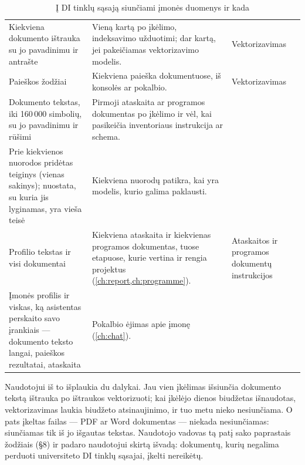 \begin{table}[H]
\caption{Į DI tinklų sąsają siunčiami įmonės duomenys ir kada}\label{tab:company:leaves}
\begin{tabularx}{\textwidth}{@{}L{43mm}YL{40mm}@{}}
\toprule
{} &  &  \\
\midrule
Kiekviena dokumento ištrauka su jo pavadinimu ir antrašte &
  Vieną kartą po įkėlimo, indeksavimo užduotimi; dar kartą, jei pakeičiamas vektorizavimo
  modelis. &
  Vektorizavimas \\
Paieškos žodžiai &
  Kiekviena paieška dokumentuose, iš konsolės ar pokalbio. &
  Vektorizavimas \\
Dokumento tekstas, iki 160\,000 simbolių, su jo pavadinimu ir rūšimi &
  Pirmoji ataskaita ar programos dokumentas po įkėlimo ir vėl, kai pasikeičia inventoriaus
  instrukcija ar schema. &
   \\
Prie kiekvienos nuorodos pridėtas teiginys (vienas sakinys); nuostata, su kuria jis lyginamas,
  yra vieša teisė &
  Kiekviena nuorodų patikra, kai yra modelis, kurio galima paklausti. &
   \\
Profilio tekstas ir visi dokumentai &
  Kiekviena ataskaita ir kiekvienas programos dokumentas, tuose etapuose, kurie vertina ir
  rengia projektus (\cref{ch:report,ch:programme}). &
  Ataskaitos ir programos dokumentų instrukcijos \\
Įmonės profilis ir viskas, ką asistentas perskaito savo įrankiais --- dokumento teksto langai,
  paieškos rezultatai, ataskaita &
  Pokalbio ėjimas apie įmonę (\cref{ch:chat}). &
   \\
\bottomrule
\end{tabularx}
\end{table}

Naudotojui iš to išplaukia du dalykai. Jau vien įkėlimas išsiunčia dokumento tekstą ištrauka po
ištraukos vektorizuoti; kai įkėlėjo dienos biudžetas išnaudotas, vektorizavimas laukia biudžeto atsinaujinimo, ir tuo
metu nieko nesiunčiama. O pats įkeltas failas --- PDF ar Word dokumentas --- niekada
nesiunčiamas: siunčiamas tik iš jo išgautas tekstas. Naudotojo vadovas tą patį sako paprastais
žodžiais (§8) ir padaro naudotojui skirtą išvadą: dokumentų, kurių negalima perduoti universiteto DI
tinklų sąsajai, įkelti nereikėtų.
